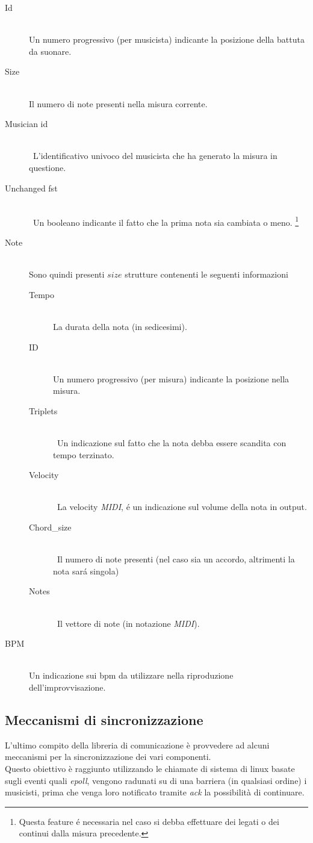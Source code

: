 \begin{description}
\item[Id] \hfill \\
Un numero progressivo (per musicista) indicante la posizione della battuta da suonare.
\item[Size] \hfill \\
Il numero di note presenti nella misura corrente.
\item[Musician id] \hfill \\\
L'identificativo univoco del musicista che ha generato la misura in questione.
\item[Unchanged fst] \hfill \\\
Un booleano indicante il fatto che la prima nota sia cambiata o meno.
\footnote{Questa feature \'e necessaria nel caso si debba effettuare dei legati
	  o dei continui dalla misura precedente.}
\item[Note] \hfill \\
Sono quindi presenti $size$ strutture contenenti le seguenti informazioni
\begin{description}
\item[Tempo] \hfill \\
La durata della nota (in sedicesimi).
\item[ID] \hfill \\
Un numero progressivo (per misura) indicante la posizione nella misura.
\item[Triplets] \hfill \\\
Un indicazione sul fatto che la nota debba essere scandita con tempo terzinato.
\item[Velocity] \hfill \\\
La velocity \emph{MIDI}, \'e un indicazione sul volume della nota in output.
\item[Chord\_size] \hfill \\\
Il numero di note presenti (nel caso sia un accordo,
altrimenti la nota sar\'a singola)
\item[Notes] \hfill \\\
Il vettore di note (in notazione \emph{MIDI}).
\end{description}
\item[BPM] \hfill \\
Un indicazione sui bpm da utilizzare nella riproduzione dell'improvvisazione.
\end{description}

\subsection{Meccanismi di sincronizzazione}
L'ultimo compito della libreria di comunicazione è
provvedere ad alcuni meccanismi per la sincronizzazione dei vari componenti.\\
Questo obiettivo è raggiunto utilizzando le chiamate di sistema di linux basate
sugli eventi quali \emph{epoll}, vengono radunati su di una barriera
(in qualsiasi ordine) i musicisti, prima che venga loro notificato tramite
\emph{ack} la possibilità di continuare.
